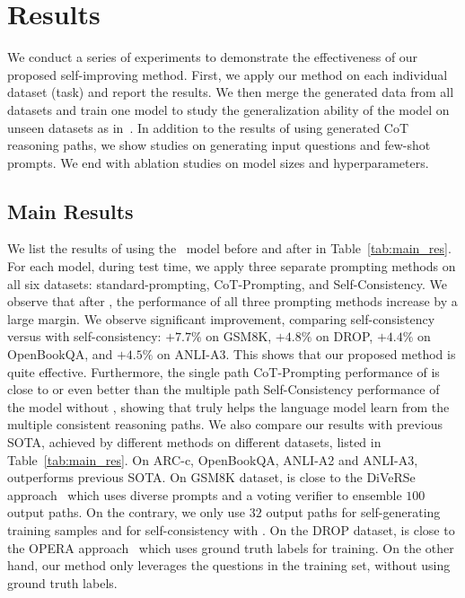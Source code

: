 \section{Results}
\label{sec:results}
We conduct a series of experiments to demonstrate the effectiveness of our proposed self-improving method. First, we apply our method on each individual dataset (task) and report the results. We then merge the generated data from all datasets and train one model to study the generalization ability of the model on unseen datasets as in~\citep{wei2021finetuned}. In addition to the results of using generated CoT reasoning paths, we show studies on generating input questions and few-shot prompts. We end with ablation studies on model sizes and hyperparameters.

\subsection{Main Results}

We list the results of using the \bigmodel~model before and after \method in Table~\ref{tab:main_res}. For each model, during test time, we apply three separate prompting methods on all six datasets: standard-prompting, CoT-Prompting, and Self-Consistency. We observe that after \method, the performance of all three prompting methods increase by a large margin. We observe significant improvement, comparing self-consistency versus \method with self-consistency: $+7.7\%$ on GSM8K, $+4.8\%$ on DROP, $+4.4\%$ on OpenBookQA, and $+4.5\%$ on ANLI-A3.
This shows that our proposed method is quite effective. 
Furthermore, the single path CoT-Prompting performance of \method is close to or even better than the multiple path Self-Consistency performance of the model without \method, showing that \method truly helps the language model learn from the multiple consistent reasoning paths. 
We also compare our results with previous SOTA, achieved by different methods on different datasets, listed in Table~\ref{tab:main_res}. On ARC-c, OpenBookQA, ANLI-A2 and ANLI-A3, \method outperforms previous SOTA. On GSM8K dataset, \method is close to the DiVeRSe approach~\citep{Li2022OnTA} which uses diverse prompts and a voting verifier to ensemble $100$ output paths. On the contrary, we only use $32$ output paths for self-generating training samples and for self-consistency with \method. On the DROP dataset, \method is close to the OPERA approach~\citep{Zhou2022OPERAOD} which uses ground truth labels for training. On the other hand, our method only leverages the questions in the training set, without using ground truth labels. 


